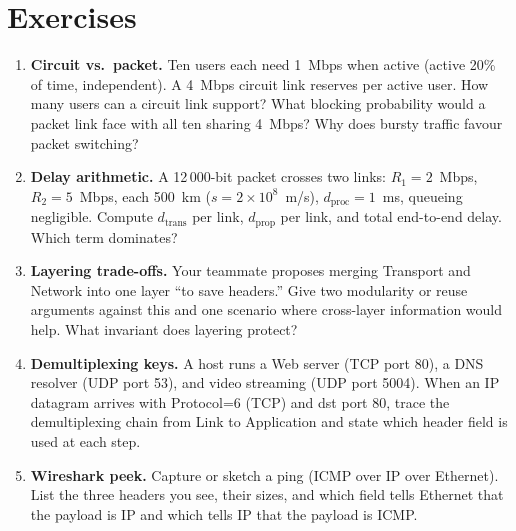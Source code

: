 \section{Exercises}
\label{sec:ch01-exercises}
\begin{enumerate}[label=E1.\arabic*, leftmargin=*, itemsep=0.8em]
    \item \textbf{Circuit vs.\ packet.} Ten users each need 1~Mbps when active (active 20\% of time, independent). A 4~Mbps circuit link reserves per active user. How many users can a circuit link support? What blocking probability would a packet link face with all ten sharing 4~Mbps? Why does bursty traffic favour packet switching?
    \item \textbf{Delay arithmetic.} A 12\,000-bit packet crosses two links: $R_1=2$~Mbps, $R_2=5$~Mbps, each 500~km ($s=2\times10^{8}$~m/s), $d_{\text{proc}}=1$~ms, queueing negligible. Compute $d_{\text{trans}}$ per link, $d_{\text{prop}}$ per link, and total end-to-end delay. Which term dominates?
    \item \textbf{Layering trade-offs.} Your teammate proposes merging Transport and Network into one layer ``to save headers.'' Give two modularity or reuse arguments against this and one scenario where cross-layer information would help. What invariant does layering protect?
    \item \textbf{Demultiplexing keys.} A host runs a Web server (TCP port 80), a DNS resolver (UDP port 53), and video streaming (UDP port 5004). When an IP datagram arrives with Protocol=6 (TCP) and dst port 80, trace the demultiplexing chain from Link to Application and state which header field is used at each step.
    \item \textbf{Wireshark peek.} Capture or sketch a ping (ICMP over IP over Ethernet). List the three headers you see, their sizes, and which field tells Ethernet that the payload is IP and which tells IP that the payload is ICMP.
\end{enumerate}
